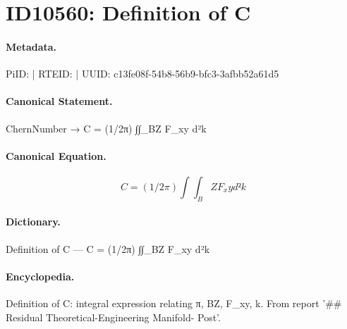 \section*{ID10560: Definition of C}
\paragraph{Metadata.}
PiID:  | RTEID:  | UUID: c13fe08f-54b8-56b9-bfc3-3afbb52a61d5

\paragraph{Canonical Statement.}
ChernNumber → C = (1/2π) ∫∫\_BZ F\_xy d²k

\paragraph{Canonical Equation.}
\[
C = (1/2π) ∫∫_BZ F_xy d²k
\]

\paragraph{Dictionary.}
Definition of C — C = (1/2π) ∫∫\_BZ F\_xy d²k

\paragraph{Encyclopedia.}
Definition of C: integral expression relating π, BZ, F\_xy, k. From report '\#\# Residual Theoretical-Engineering Manifold- Post'.
